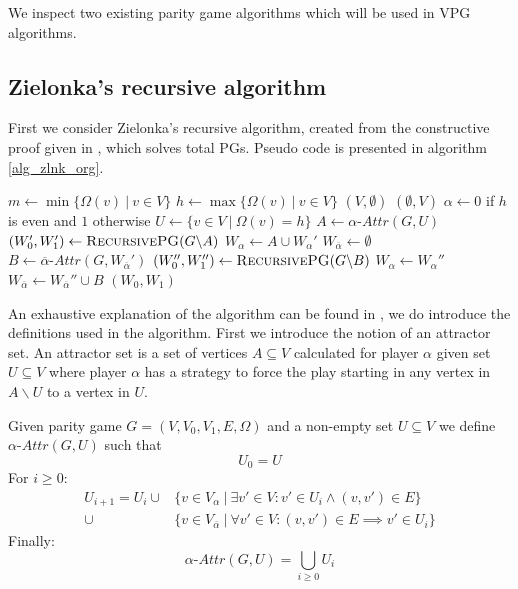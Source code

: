 We inspect two existing parity game algorithms which will be used in VPG algorithms.
\subsection{Zielonka's recursive algorithm}
First we consider Zielonka's recursive algorithm, created from the constructive proof given in \cite{ZIELONKA1998135}, which solves total PGs. Pseudo code is presented in algorithm \ref{alg_zlnk_org}.
\begin{algorithm}
	\caption{$\textsc{RecursivePG}(\textit{PG } G = (V,V_0,V_1, E, \Omega))$}
	\label{alg_zlnk_org}
	\begin{algorithmic}[1]
		\State $m \gets \min\{ \Omega(v)\ |\ v \in V\}$
		\State $h \gets\max\{ \Omega(v)\ |\ v \in V\}$
		\State \Return $(V,\emptyset)$
		\Else
		\State \Return $(\emptyset, V)$
		\EndIf
		\EndIf
		\State $\alpha \gets 0$ if $h$ is even and $1$ otherwise
		\State $U \gets \{v \in V\ |\ \Omega(v) = h\}$
		\State $A \gets \alpha\textit{-Attr}(G, U)$
		\State $(W_0', W_1') \gets \textsc{RecursivePG}(G \backslash A)$
		\State $W_\alpha \gets A \cup W_\alpha'$
		\State $W_{\overline{\alpha}} \gets \emptyset$
		\Else
		\State $B \gets \overline{\alpha}\textit{-Attr}(G,W_{\overline{\alpha}}')$
		\State $(W_0'', W_1'') \gets \textsc{RecursivePG}(G \backslash B)$
		\State $W_\alpha \gets W_\alpha''$
		\State $W_{\overline{\alpha}} \gets W_{\overline{\alpha}}'' \cup B$
		\EndIf
		\State \Return $(W_0, W_1)$
	\end{algorithmic}
\end{algorithm}

An exhaustive explanation of the algorithm can be found in \cite{ZIELONKA1998135}, we do introduce the definitions used in the algorithm. First we introduce the notion of an attractor set. An attractor set is a set of vertices $A \subseteq V$ calculated for player $\alpha$ given set $U \subseteq V$ where player $\alpha$ has a strategy to force the play starting in any vertex in $A \backslash U$ to a vertex in $U$.


\begin{definition}\cite{ZIELONKA1998135}
	\label{def_attr}Given parity game $G = (V,V_0,V_1,E,\Omega)$ and a non-empty set $U \subseteq V$ we define $\alpha\textit{-Attr}(G,U)$ such that
	\[U_0 = U \]
	For $i \geq 0$:
	\begin{align*}
	U_{i+1} = U_i\cup
	&\{v \in V_\alpha\ |\ \exists v' \in V : v' \in U_i \wedge (v,v') \in E \}\\
	\cup &\{v \in V_{\overline{\alpha}}\ |\ \forall v' \in V :(v,v') \in E \implies v' \in U_i \}
	\end{align*}
	Finally:
	\[\alpha\textit{-Attr}(G,U) = \bigcup_{i \geq 0} U_i \]
\end{definition}

